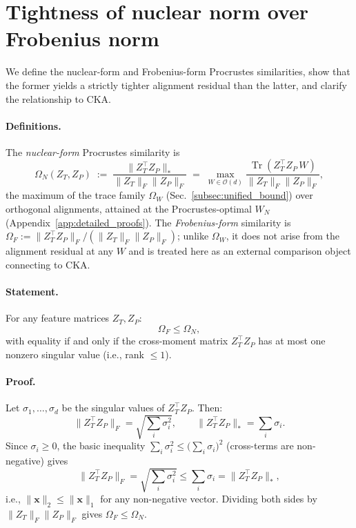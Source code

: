 
\section{Tightness of nuclear norm over Frobenius norm}
\label{app:tightness}

We define the nuclear-form and Frobenius-form Procrustes similarities, show that the former yields a strictly tighter alignment residual than the latter, and clarify the relationship to CKA.

\paragraph{Definitions.}
The \emph{nuclear-form} Procrustes similarity is
\begin{equation}
\label{eq:omega_nuclear}
\Omega_N(Z_T, Z_P) \;:=\; \frac{\|Z_T^\top Z_P\|_*}{\|Z_T\|_F \|Z_P\|_F}
\;=\; \max_{W \in \mathcal{O}(d)} \frac{\operatorname{Tr}(Z_T^\top Z_P\, W)}{\|Z_T\|_F \|Z_P\|_F},
\end{equation}
the maximum of the trace family $\Omega_W$ (Sec.~\ref{subsec:unified_bound}) over orthogonal alignments, attained at the Procrustes-optimal $W_N$ (Appendix~\ref{app:detailed_proofs}). The \emph{Frobenius-form} similarity is $\Omega_F := \|Z_T^\top Z_P\|_F / (\|Z_T\|_F \|Z_P\|_F)$; unlike $\Omega_W$, it does not arise from the alignment residual at any $W$ and is treated here as an external comparison object connecting to CKA.

\paragraph{Statement.}
For any feature matrices $Z_T, Z_P$:
\begin{equation}
\Omega_F \le \Omega_N,
\end{equation}
with equality if and only if the cross-moment matrix $Z_T^\top Z_P$ has at most one nonzero singular value (i.e., rank $\le 1$).

\paragraph{Proof.}
Let $\sigma_1, \ldots, \sigma_d$ be the singular values of $Z_T^\top Z_P$. Then:
\begin{equation}
\|Z_T^\top Z_P\|_F = \sqrt{\sum_i \sigma_i^2}, \qquad \|Z_T^\top Z_P\|_* = \sum_i \sigma_i.
\end{equation}
Since $\sigma_i \ge 0$, the basic inequality $\sum_i \sigma_i^2 \le \big(\sum_i \sigma_i\big)^2$ (cross-terms are non-negative) gives
\begin{equation}
\|Z_T^\top Z_P\|_F = \sqrt{\sum_i \sigma_i^2} \le \sum_i \sigma_i = \|Z_T^\top Z_P\|_*,
\end{equation}
i.e., $\|\mathbf{x}\|_2 \le \|\mathbf{x}\|_1$ for any non-negative vector. Dividing both sides by $\|Z_T\|_F \|Z_P\|_F$ gives $\Omega_F \le \Omega_N$.

